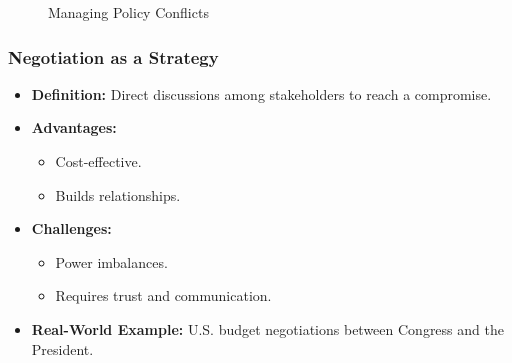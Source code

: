 \documentclass[10pt]{beamer}
\begin{document}
\begin{frame}
\begin{frame}
                    \begin{figure}
                        \centering
                        \caption{Managing Policy Conflicts}
                    \end{figure}
                    \end{frame}
    
    \begin{frame}
    \frametitle{Negotiation as a Strategy}
    \begin{itemize}
        \item \textbf{Definition:} Direct discussions among stakeholders to reach a compromise.
        \item \textbf{Advantages:}
            \begin{itemize}
                \item Cost-effective.
                \item Builds relationships.
            \end{itemize}
        \item \textbf{Challenges:}
            \begin{itemize}
                \item Power imbalances.
                \item Requires trust and communication.
            \end{itemize}
        \item \textbf{Real-World Example:} U.S. budget negotiations between Congress and the President.
    \end{itemize}
    \end{frame}


\end{frame}
\end{document}
